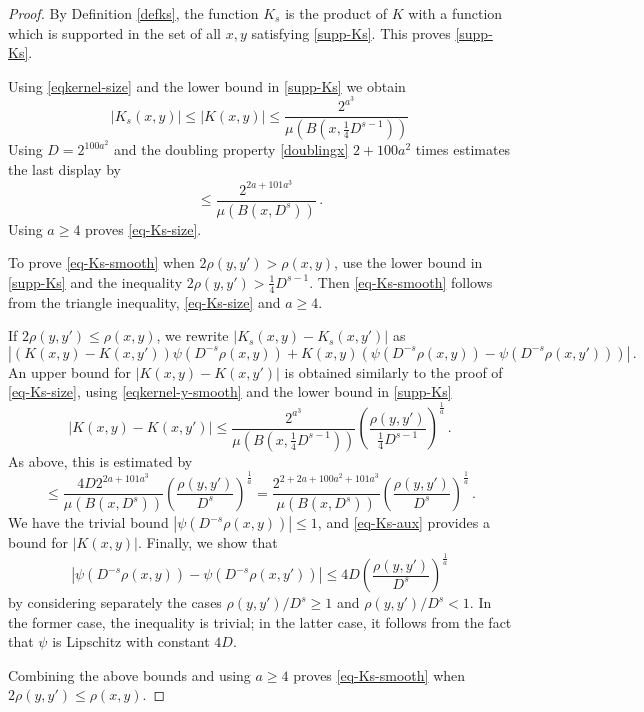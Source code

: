 \begin{proof}
    \leanok
    By Definition \eqref{defks}, the function $K_s$ is the product of
    $K$ with a function which is supported in the set of all
    $x,y$ satisfying \eqref{supp-Ks}. This proves
    \eqref{supp-Ks}.

    Using \eqref{eqkernel-size} and the lower bound in \eqref{supp-Ks}
    we obtain
    \begin{equation}
        \label{eqkernel-size-Ks}
        |K_s(x,y)|\le |K(x,y)|\le \frac{2^{a^3}}{\mu(B(x,\frac 14 D^{s-1}))}
    \end{equation}
    Using $D=2^{100a^2}$
    and the doubling property \eqref{doublingx} $2 +100a^2$ times estimates
    the last display by
    \begin{equation}
        \label{eq-Ks-aux}
        \le \frac{2^{2a+101a^3}}{\mu(B(x, D^{s}))}\, .
    \end{equation}
    Using $a\ge 4$ proves \eqref{eq-Ks-size}.

    To prove \eqref{eq-Ks-smooth} when $2\rho(y,y') > \rho(x,y)$, use the lower bound in
    \eqref{supp-Ks} and the inequality $2\rho(y,y') > \frac{1}{4}D^{s-1}$. Then \eqref{eq-Ks-smooth} follows from
    the triangle inequality, \eqref{eq-Ks-size} and $a \ge 4$.

    If $2\rho(y,y') \le \rho(x,y)$, we rewrite $|K_s(x,y)-K_s(x, y')|$ as
    \begin{equation}
        |(K(x,y)-K(x,y')) \psi(D^{-s}\rho(x,y)) +
        K(x,y)(\psi(D^{-s}\rho(x,y))-\psi(D^{-s}\rho(x,y')))|\,.
    \end{equation}
    An upper bound for $|K(x,y)-K(x, y')|$ is obtained similarly to the proof of
    \eqref{eq-Ks-size}, using \eqref{eqkernel-y-smooth} and the lower bound in \eqref{supp-Ks}
    \begin{equation}
        |K(x,y)-K(x, y')|\le \frac{2^{a^3}}{\mu(B(x, \frac 14 D^{s-1}))}
        \left(\frac{ \rho(y,y')}{\frac 14 D^{s-1}}\right)^{\frac 1a}\,.
    \end{equation}
    As above, this is estimated by
    \begin{equation}
       \le \frac{4D 2^{2a+101a^3}}{\mu(B(x, D^{s}))}
        \left(\frac{ \rho(y,y')}{D^{s}}\right)^{\frac 1a}
         = \frac{2^{2+2a+100a^2+101a^3}}{\mu(B(x, D^{s}))}
        \left(\frac{ \rho(y,y')}{D^{s}}\right)^{\frac 1a}\,.
    \end{equation}
    We have the trivial bound $|\psi(D^{-s}\rho(x,y))| \leq 1$, and \eqref{eq-Ks-aux}
    provides a bound for $|K(x,y)|$. Finally, we show that
    \begin{equation}
        |\psi(D^{-s}\rho(x,y))-\psi(D^{-s}\rho(x,y'))|\le
        4D \left(\frac{\rho(y, y')}{D ^ s}\right)^{\frac 1a}
    \end{equation}
    by considering separately the cases $\rho(y,y')/D^s \ge 1$ and $\rho(y,y')/D^s < 1$. In the
    former case, the inequality is trivial; in the latter case, it follows from the
    fact that $\psi$ is Lipschitz with constant $4D$.

    Combining the above bounds and using $a\ge 4$ proves \eqref{eq-Ks-smooth} when
    $2\rho(y,y') \le \rho(x,y)$.
\end{proof}


